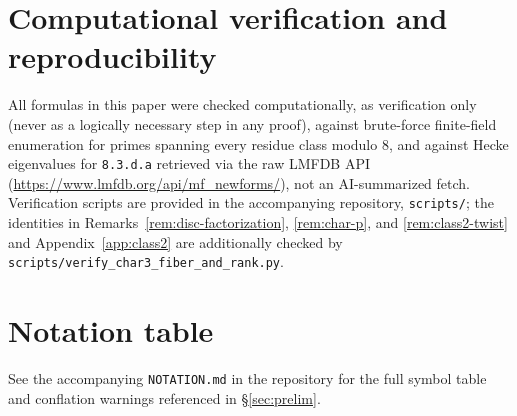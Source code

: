 \documentclass[11pt]{amsart}
\theoremstyle{definition}
\begin{document}
\section{Computational verification and reproducibility}
\label{app:scripts}

All formulas in this paper were checked computationally, as verification only (never as a logically necessary step in any proof), against brute-force finite-field enumeration for primes spanning every residue class modulo $8$, and against Hecke eigenvalues for \texttt{8.3.d.a} retrieved via the raw LMFDB API (\url{https://www.lmfdb.org/api/mf_newforms/}), not an AI-summarized fetch. Verification scripts are provided in the accompanying repository, \texttt{scripts/}; the identities in Remarks~\ref{rem:disc-factorization}, \ref{rem:char-p}, and \ref{rem:class2-twist} and Appendix~\ref{app:class2} are additionally checked by \texttt{scripts/verify\_char3\_fiber\_and\_rank.py}.

\section*{Notation table}
\label{app:notation}
See the accompanying \texttt{NOTATION.md} in the repository for the full symbol table and conflation warnings referenced in \S\ref{sec:prelim}.

\label{sec:refs}
\end{document}
